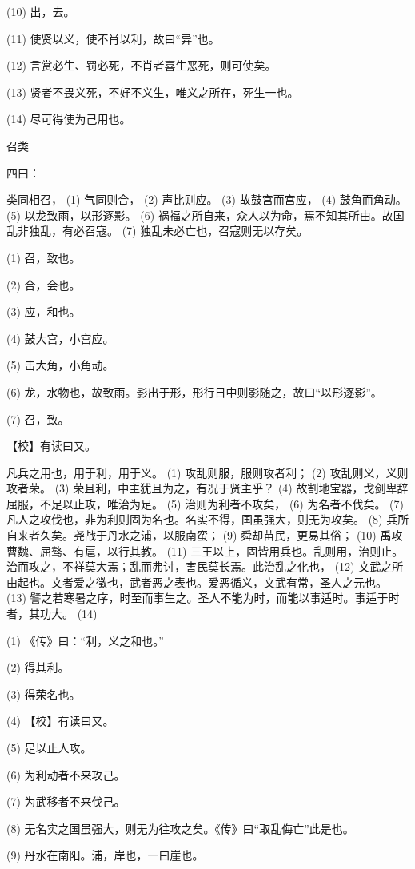 \documentclass[12pt,UTF8]{ctexbook}
\begin{document}
(10) 出，去。

(11) 使贤以义，使不肖以利，故曰“异”也。

(12) 言赏必生、罚必死，不肖者喜生恶死，则可使矣。

(13) 贤者不畏义死，不好不义生，唯义之所在，死生一也。

(14) 尽可得使为己用也。





召类


四曰：

类同相召， (1) 气同则合， (2) 声比则应。 (3) 故鼓宫而宫应， (4) 鼓角而角动。 (5) 以龙致雨，以形逐影。 (6) 祸福之所自来，众人以为命，焉不知其所由。故国乱非独乱，有必召寇。 (7) 独乱未必亡也，召寇则无以存矣。

(1) 召，致也。

(2) 合，会也。

(3) 应，和也。

(4) 鼓大宫，小宫应。

(5) 击大角，小角动。

(6) 龙，水物也，故致雨。影出于形，形行日中则影随之，故曰“以形逐影”。

(7) 召，致。

【校】有读曰又。

凡兵之用也，用于利，用于义。 (1) 攻乱则服，服则攻者利； (2) 攻乱则义，义则攻者荣。 (3) 荣且利，中主犹且为之，有况于贤主乎？ (4) 故割地宝器，戈剑卑辞屈服，不足以止攻，唯治为足。 (5) 治则为利者不攻矣， (6) 为名者不伐矣。 (7) 凡人之攻伐也，非为利则固为名也。名实不得，国虽强大，则无为攻矣。 (8) 兵所自来者久矣。尧战于丹水之浦，以服南蛮； (9) 舜却苗民，更易其俗； (10) 禹攻曹魏、屈骜、有扈，以行其教。 (11) 三王以上，固皆用兵也。乱则用，治则止。治而攻之，不祥莫大焉；乱而弗讨，害民莫长焉。此治乱之化也， (12) 文武之所由起也。文者爱之徵也，武者恶之表也。爱恶循义，文武有常，圣人之元也。 (13) 譬之若寒暑之序，时至而事生之。圣人不能为时，而能以事适时。事适于时者，其功大。 (14)

(1) 《传》曰：“利，义之和也。”

(2) 得其利。

(3) 得荣名也。

(4) 【校】有读曰又。

(5) 足以止人攻。

(6) 为利动者不来攻己。

(7) 为武移者不来伐己。

(8) 无名实之国虽强大，则无为往攻之矣。《传》曰“取乱侮亡”此是也。

(9) 丹水在南阳。浦，岸也，一曰崖也。
\end{document}
